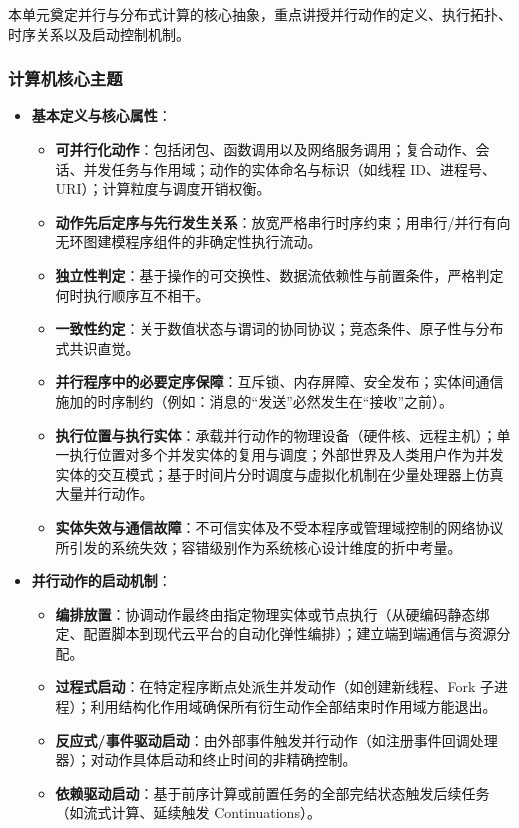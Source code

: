 本单元奠定并行与分布式计算的核心抽象，重点讲授并行动作的定义、执行拓扑、时序关系以及启动控制机制。

\subsubsection{计算机核心主题}
\begin{itemize}
    \item \textbf{基本定义与核心属性}：
    \begin{itemize}
        \item \textbf{可并行化动作}：包括闭包、函数调用以及网络服务调用；复合动作、会话、并发任务与作用域；动作的实体命名与标识（如线程 ID、进程号、URI）；计算粒度与调度开销权衡。
        \item \textbf{动作先后定序与先行发生关系}：放宽严格串行时序约束；用串行/并行有向无环图建模程序组件的非确定性执行流动。
        \item \textbf{独立性判定}：基于操作的可交换性、数据流依赖性与前置条件，严格判定何时执行顺序互不相干。
        \item \textbf{一致性约定}：关于数值状态与谓词的协同协议；竞态条件、原子性与分布式共识直觉。
        \item \textbf{并行程序中的必要定序保障}：互斥锁、内存屏障、安全发布；实体间通信施加的时序制约（例如：消息的“发送”必然发生在“接收”之前）。
        \item \textbf{执行位置与执行实体}：承载并行动作的物理设备（硬件核、远程主机）；单一执行位置对多个并发实体的复用与调度；外部世界及人类用户作为并发实体的交互模式；基于时间片分时调度与虚拟化机制在少量处理器上仿真大量并行动作。
        \item \textbf{实体失效与通信故障}：不可信实体及不受本程序或管理域控制的网络协议所引发的系统失效；容错级别作为系统核心设计维度的折中考量。
    \end{itemize}
    \item \textbf{并行动作的启动机制}：
    \begin{itemize}
        \item \textbf{编排放置}：协调动作最终由指定物理实体或节点执行（从硬编码静态绑定、配置脚本到现代云平台的自动化弹性编排）；建立端到端通信与资源分配。
        \item \textbf{过程式启动}：在特定程序断点处派生并发动作（如创建新线程、Fork 子进程）；利用结构化作用域确保所有衍生动作全部结束时作用域方能退出。
        \item \textbf{反应式/事件驱动启动}：由外部事件触发并行动作（如注册事件回调处理器）；对动作具体启动和终止时间的非精确控制。
        \item \textbf{依赖驱动启动}：基于前序计算或前置任务的全部完结状态触发后续任务（如流式计算、延续触发 Continuations）。
    \end{itemize}
\end{itemize}

